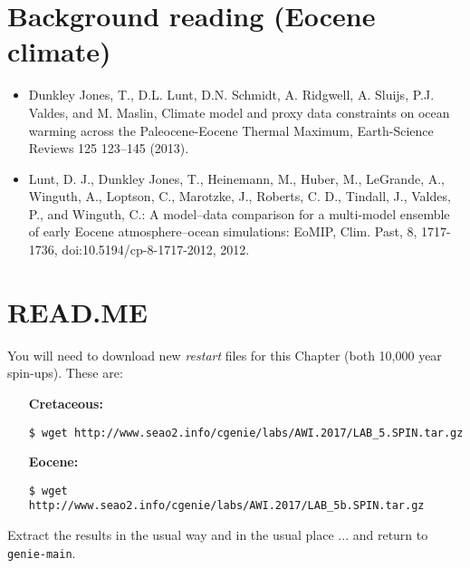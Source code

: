 \documentclass[11pt,fleqn]{book} %
\begin{document}
\section*{Background reading (Eocene climate)}
\begin{itemize}
\item Dunkley Jones, T., D.L. Lunt, D.N. Schmidt, A. Ridgwell, A. Sluijs, P.J. Valdes, and M. Maslin, Climate model and proxy data constraints on ocean warming across the Paleocene-Eocene Thermal Maximum, Earth-Science Reviews 125 123–145 (2013).
\item Lunt, D. J., Dunkley Jones, T., Heinemann, M., Huber, M., LeGrande, A., Winguth, A., Loptson, C., Marotzke, J., Roberts, C. D., Tindall, J., Valdes, P., and Winguth, C.: A model–data comparison for a multi-model ensemble of early Eocene atmosphere–ocean simulations: EoMIP, Clim. Past, 8, 1717-1736, doi:10.5194/cp-8-1717-2012, 2012.
\end{itemize}


\newpage


\section*{READ.ME}

You will need to download new \textit{restart} files for this Chapter (both 10,000 year spin-ups). These are:

\vspace{2mm}
\begin{enumerate}[noitemsep]
\item[\textbf{Cretaceous:}]
\begin{verbatim}
$ wget http://www.seao2.info/cgenie/labs/AWI.2017/LAB_5.SPIN.tar.gz
\end{verbatim}
\item[\textbf{Eocene:}]
\begin{verbatim}
$ wget http://www.seao2.info/cgenie/labs/AWI.2017/LAB_5b.SPIN.tar.gz
\end{verbatim}
\end{enumerate}
\vspace{2mm}

Extract the results in the usual way and in the usual place ... and return to \texttt{genie-main}.

\end{document}
